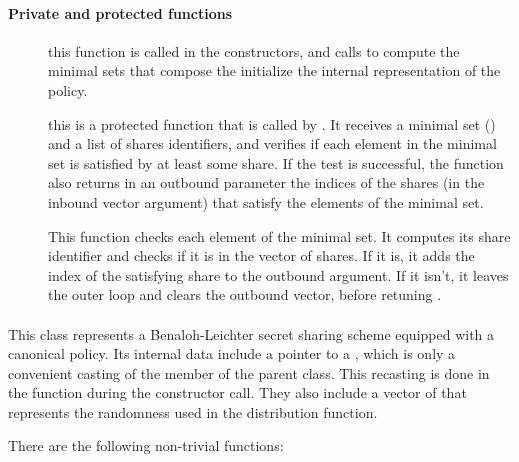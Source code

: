 \documentclass{article}
\begin{document}
\paragraph{Private and protected functions}
\begin{description}
\item[] this function is called in the constructors, and calls  to compute the minimal sets that compose the 
initialize the internal representation of the policy. 
\item[] this is a protected function that is called by . It receives a minimal set () and a list of shares identifiers, and verifies if each element in the minimal set is satisfied by at least some share. If the test is successful, the function also returns in an outbound parameter the indices of the shares (in the inbound vector argument) that satisfy the elements of the minimal set. 

This function checks each element of the minimal set. It computes its share identifier and checks if it is in the vector of shares. If it is, it adds the index of the satisfying share to the outbound argument. If it isn't, it leaves the outer  loop and clears the outbound vector, before retuning .
\end{description}

\paragraph{\cSS}

This class represents a Benaloh-Leichter secret sharing scheme equipped with a canonical policy. Its internal data include a pointer to a \cBLcanonAP, which is only a convenient casting of the member  of the parent class. This recasting is done in the function  during the constructor call.  They also include a vector of \cBig that represents the randomness used in the distribution function.

There are the following non-trivial functions:
\end{document}
